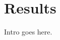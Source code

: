 \documentclass[Thesis.tex]{subfiles}
\begin{document}
\chapter{Results}

Intro goes here.
\end{document}
